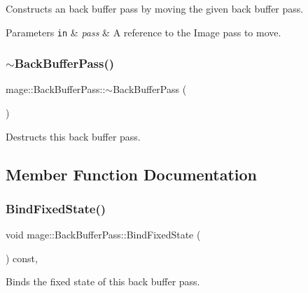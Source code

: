 Constructs an back buffer pass by moving the given back buffer pass.


\begin{DoxyParams}[1]{Parameters}
\mbox{\tt in}  & {\em pass} & A reference to the Image pass to move. \\
\hline
\end{DoxyParams}
\hypertarget{classmage_1_1_back_buffer_pass_a10ccd92ff4480261e9ecfc435f5d9ed3}{}\label{classmage_1_1_back_buffer_pass_a10ccd92ff4480261e9ecfc435f5d9ed3} 
\subsubsection{\texorpdfstring{$\sim$\+Back\+Buffer\+Pass()}{~BackBufferPass()}}
{\footnotesize\ttfamily mage\+::\+Back\+Buffer\+Pass\+::$\sim$\+Back\+Buffer\+Pass (\begin{DoxyParamCaption}{ }\end{DoxyParamCaption})\hspace{0.3cm}{\ttfamily [default]}}

Destructs this back buffer pass. 

\subsection{Member Function Documentation}
\hypertarget{classmage_1_1_back_buffer_pass_a4e66e041f37dddb4a26c549f4dc090a6}{}\label{classmage_1_1_back_buffer_pass_a4e66e041f37dddb4a26c549f4dc090a6} 
\subsubsection{\texorpdfstring{Bind\+Fixed\+State()}{BindFixedState()}}
{\footnotesize\ttfamily void mage\+::\+Back\+Buffer\+Pass\+::\+Bind\+Fixed\+State (\begin{DoxyParamCaption}{ }\end{DoxyParamCaption}) const\hspace{0.3cm}{\ttfamily [private]}, {\ttfamily [noexcept]}}

Binds the fixed state of this back buffer pass. \hypertarget{classmage_1_1_back_buffer_pass_ae925b441c80f2aa711fbba6d782e5f81}{}\label{classmage_1_1_back_buffer_pass_ae925b441c80f2aa711fbba6d782e5f81} 
